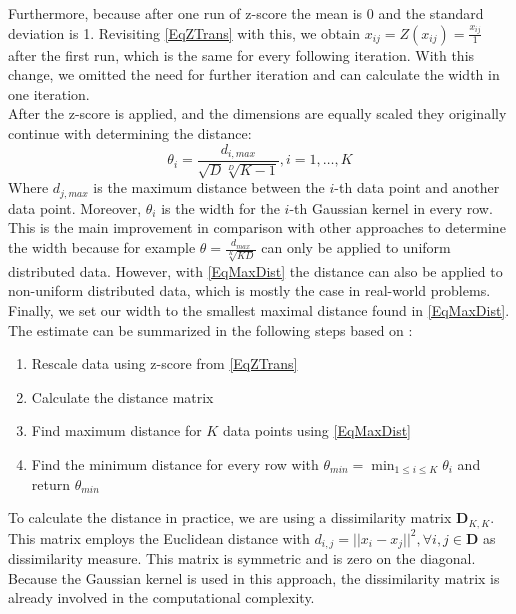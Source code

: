 Furthermore, because after one run of z-score the mean is 0 and the standard deviation is 1.\cite{Mohamad.2013}
Revisiting \eqref{EqZTrans} with this, we obtain $x_{ij} = Z(x_{ij}) = \frac{x_{ij}}{1}$ after the first run, which is the same for every following iteration.
With this change, we omitted the need for further iteration and can calculate the width in one iteration.\\
After the z-score is applied, and the dimensions are equally scaled they originally continue with determining the distance:\cite{Kitayama.2011}
\begin{equation}\label{EqMaxDist}
	\theta_i = \frac{d_{i,max}}{\sqrt{D}\sqrt[D]{K-1}}, i=1,\dots,K
\end{equation}
Where $d_{j,max}$ is the maximum distance between the $i$-th data point and another data point.
Moreover, $\theta_i$ is the width for the $i$-th Gaussian kernel in every row.\\
This is the main improvement in comparison with other approaches to determine the width because for example $\theta =\frac{d_{max}}{\sqrt[K]{KD}}$ can only be applied to uniform distributed data.
However, with \eqref{EqMaxDist} the distance can also be applied to non-uniform distributed data, which is mostly the case in real-world problems.\cite{Kitayama.2011}\newline
Finally, we set our width to the smallest maximal distance found in \eqref{EqMaxDist}.
The estimate can be summarized in the following steps based on \cite{Kitayama.2011}:
\begin{enumerate}[label=\bfseries Step \arabic*:,leftmargin=*,labelindent=1em]
	\item Rescale data using z-score from \eqref{EqZTrans}
	\item Calculate the distance matrix
	\item Find maximum distance for $K$ data points using \eqref{EqMaxDist}
	\item Find the minimum distance for every row with $\displaystyle\theta_{min}=\min_{1 \le i \le K}\theta_i$ and return $\theta_{min}$
\end{enumerate}
To calculate the distance in practice, we are using a dissimilarity matrix $\mathbf{D}_{K,K}$.
This matrix employs the Euclidean distance with $d_{i,j}=||x_i-x_j||^2, \forall i,j \in \mathbf{D}$ as dissimilarity measure.
This matrix is symmetric and is zero on the diagonal.\cite[p. 22;299]{Gentle.2007}\newline
Because the Gaussian kernel is used in this approach, the dissimilarity matrix is already involved in the computational complexity.

